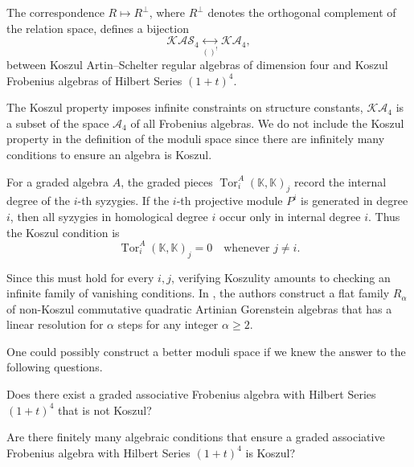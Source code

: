 \documentclass{amsart}
\DeclareMathOperator{\Tor}{Tor}
\begin{document}
\begin{remark}
The correspondence \( R \mapsto R^\perp \), where \( R^\perp \) denotes the orthogonal complement of the relation space, defines a bijection
\[
\mathcal{KAS}_4 \underset{()^!}{\longleftrightarrow} \mathcal{KA}_4,
\]
between Koszul Artin--Schelter regular algebras of dimension four and Koszul Frobenius algebras of Hilbert Series $(1+t)^4.$

The Koszul property imposes infinite constraints on structure constants, \( \mathcal{KA}_4 \) is a subset of the space \( \mathcal{A}_4 \) of all Frobenius algebras.
We do not include the Koszul property in the definition of the moduli space since there are infinitely many conditions to ensure an algebra is Koszul.  

For a graded algebra $A$, the graded pieces $\Tor^A_i(\mathbb{K},\mathbb{K})_j$ record the internal degree of the $i$-th syzygies. If the $i$-th projective module $P^i$ is generated in degree $i$, then all syzygies in homological degree $i$ occur only in internal degree $i$. Thus the Koszul condition is
\[
\Tor^A_i(\mathbb{K},\mathbb{K})_j = 0 \quad \text{whenever } j \neq i.
\]

Since this must hold for every $i,j$, verifying Koszulity amounts to checking an infinite family of vanishing conditions.
In \cite[Theorem 5.1]{nonKoszul}, the authors construct a flat family $R_\alpha$ of non-Koszul commutative quadratic Artinian Gorenstein algebras that has a linear resolution for $\alpha$ steps for any integer $\alpha \geq 2.$
\end{remark}
One could possibly construct a better moduli space if we knew the answer to the following questions.

\begin{question}
Does there exist a graded associative Frobenius algebra with Hilbert Series $(1+t)^4$ that is not Koszul?
\end{question}

\begin{question}
    Are there finitely many algebraic conditions that ensure a graded associative Frobenius algebra with Hilbert Series $(1+t)^4$ is Koszul?
\end{question}
\end{document}
